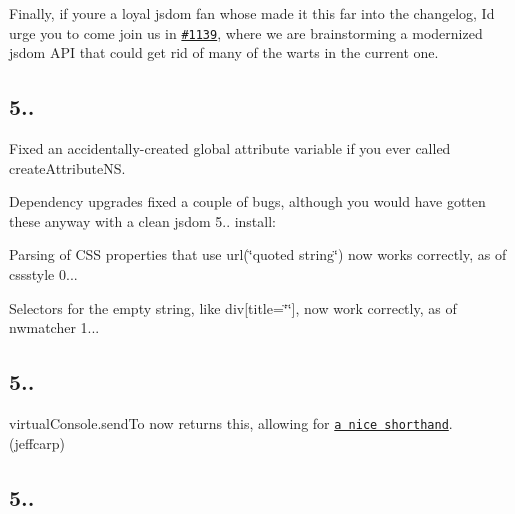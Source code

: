 Finally, if you\textquotesingle{}re a loyal jsdom fan whose made it this far into the changelog, I\textquotesingle{}d urge you to come join us in \href{https://github.com/tmpvar/jsdom/issues/1139}{\tt \#1139}, where we are brainstorming a modernized jsdom A\+PI that could get rid of many of the warts in the current one.

\subsection*{5..}


\begin{DoxyItemize}
\item Fixed an accidentally-\/created global {\ttfamily attribute} variable if you ever called {\ttfamily create\+Attribute\+NS}.
\item Dependency upgrades fixed a couple of bugs, although you would have gotten these anyway with a clean jsdom 5.. install\+:
\begin{DoxyItemize}
\item Parsing of C\+SS properties that use {\ttfamily url(\char`\"{}quoted string\char`\"{})} now works correctly, as of {\ttfamily cssstyle} 0...
\item Selectors for the empty string, like {\ttfamily div\mbox{[}title=\char`\"{}\char`\"{}\mbox{]}}, now work correctly, as of {\ttfamily nwmatcher} 1...
\end{DoxyItemize}
\end{DoxyItemize}

\subsection*{5..}


\begin{DoxyItemize}
\item {\ttfamily virtual\+Console.\+send\+To} now returns {\ttfamily this}, allowing for \href{https://github.com/tmpvar/jsdom/tree/60ccb9b318d0bae8fe37e19af5af444b9c98ddac#forward-a-windows-console-output-to-the-iojs-console}{\tt a nice shorthand}. (jeffcarp)
\end{DoxyItemize}

\subsection*{5..}


